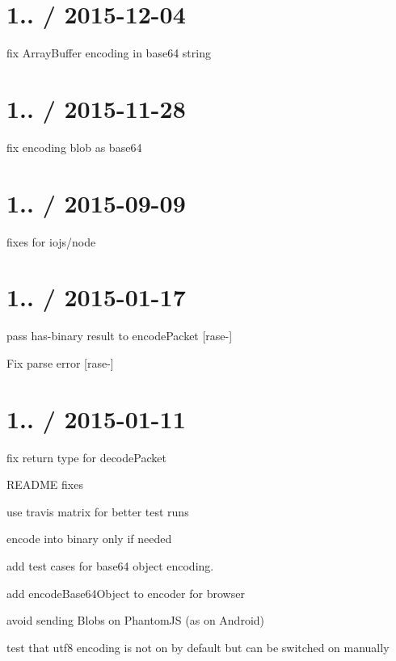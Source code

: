 \section*{1.. / 2015-\/12-\/04 }


\begin{DoxyItemize}
\item fix {\ttfamily Array\+Buffer} encoding in base64 string
\end{DoxyItemize}

\section*{1.. / 2015-\/11-\/28 }


\begin{DoxyItemize}
\item fix encoding blob as base64
\end{DoxyItemize}

\section*{1.. / 2015-\/09-\/09 }


\begin{DoxyItemize}
\item fixes for iojs/node
\end{DoxyItemize}

\section*{1.. / 2015-\/01-\/17 }


\begin{DoxyItemize}
\item pass has-\/binary result to encode\+Packet \mbox{[}rase-\/\mbox{]}
\item Fix parse error \mbox{[}rase-\/\mbox{]}
\end{DoxyItemize}

\section*{1.. / 2015-\/01-\/11 }


\begin{DoxyItemize}
\item fix return type for decode\+Packet
\item R\+E\+A\+D\+ME fixes
\item use travis matrix for better test runs
\item encode into binary only if needed
\item add test cases for base64 object encoding.
\item add encode\+Base64\+Object to encoder for browser
\item avoid sending Blobs on Phantom\+JS (as on Android)
\item test that utf8 encoding is not on by default but can be switched on manually
\end{DoxyItemize}

